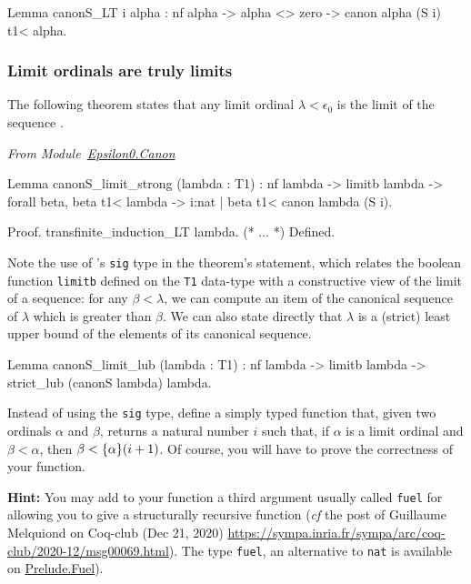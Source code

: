\label{lemma:canonS_LT}
\begin{Coqsrc}
Lemma canonS_LT i alpha :
  nf alpha -> alpha <> zero ->
  canon alpha (S i) t1<  alpha.
\end{Coqsrc}


\subsubsection{Limit ordinals are truly limits}
The following theorem states that any limit ordinal $\lambda<\epsilon_0$ 
is the limit of the sequence .


\vspace{4pt}
\emph{From Module~\href{../theories/html/hydras.Epsilon0.Canon.html\#canonS_limit_strong}{Epsilon0.Canon}}


\begin{Coqsrc}
Lemma canonS_limit_strong (lambda : T1) : 
     nf lambda ->
     limitb lambda  ->
     forall beta, beta t1< lambda ->
                  {i:nat | beta t1< canon lambda (S i)}.

Proof.
  transfinite_induction_LT lambda.
  (* ... *)
Defined.
\end{Coqsrc}

\label{lemma:canonS-limit}


Note the use of \coq's \texttt{sig} type in the theorem's statement, which
relates the boolean function \texttt{limitb} defined on the \texttt{T1} data-type with a constructive view of the limit of a sequence: for any $\beta<\lambda$, we can compute an item of the canonical sequence of $\lambda$ which is greater than $\beta$.
We can also state directly that $\lambda$ is a (strict) least upper bound of the elements of its canonical sequence.


\begin{Coqsrc}
Lemma canonS_limit_lub (lambda : T1) :
  nf lambda -> limitb lambda  ->
  strict_lub (canonS lambda) lambda.
\end{Coqsrc}


\begin{exercise}\label{exo:simply-typed-canonseq}
Instead of using the \texttt{sig} type, define a simply typed function that, given two ordinals $\alpha$ and $\beta$, returns a natural number $i$ such that, if $\alpha$ is a limit ordinal and $\beta<\alpha$, then $\beta< \mbox{$\{\alpha\}(i+1)$}$. Of course, you will have to prove the correctness of your function. 

\textbf{Hint:} You may add to your function a third argument usually called \texttt{fuel} for allowing you to give a structurally 
recursive function (\emph{cf} the post of Guillaume Melquiond on Coq-club (Dec 21, 2020)
\url{https://sympa.inria.fr/sympa/arc/coq-club/2020-12/msg00069.html}).
The type \texttt{fuel}, an alternative 
to \texttt{nat} is available on \href{../theories/html/hydras.Prelude.Fuel.html}{Prelude.Fuel}).

\end{exercise}







